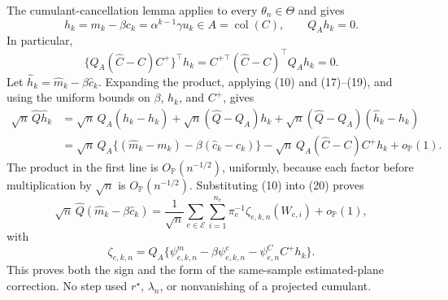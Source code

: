 The cumulant-cancellation lemma applies to every \(\theta_n\in\Theta\) and gives
\[
 h_k=m_k-\beta c_k=\alpha^{k-1}\gamma u_k\in A=\operatorname{col}(C),
 \qquad Q_Ah_k=0. \tag{18}
\]
In particular,
\[
 \{Q_A(\widehat C-C)C^+\}^\top h_k
 =C^{+\top}(\widehat C-C)^\top Q_Ah_k=0. \tag{19}
\]
Let \(\widehat h_k=\widehat m_k-\beta\widehat c_k\).  Expanding the product, applying (10) and (17)--(19), and using the uniform bounds on \(\beta\), \(h_k\), and \(C^+\), gives
\[
 \begin{aligned}
 \sqrt n\,\widehat Q\widehat h_k
 &=\sqrt n\,Q_A(\widehat h_k-h_k)
   +\sqrt n(\widehat Q-Q_A)h_k
   +\sqrt n(\widehat Q-Q_A)(\widehat h_k-h_k)\\
 &=\sqrt n\,Q_A\{(\widehat m_k-m_k)
       -\beta(\widehat c_k-c_k)\}
   -\sqrt n\,Q_A(\widehat C-C)C^+h_k+o_{\mathbb P}(1). 
 \end{aligned} \tag{20}
\]
The product in the first line is \(O_{\mathbb P}(n^{-1/2})\), uniformly, because each factor before multiplication by \(\sqrt n\) is \(O_{\mathbb P}(n^{-1/2})\).  Substituting (10) into (20) proves
\[
 \sqrt n\,\widehat Q(\widehat m_k-\beta\widehat c_k)
 =\frac1{\sqrt n}\sum_{e\in\mathcal E}\sum_{i=1}^{n_e}
   \pi_e^{-1}\zeta_{e,k,n}(W_{e,i})+o_{\mathbb P}(1), \tag{21}
\]
with
\[
 \zeta_{e,k,n}
 =Q_A\{\psi^m_{e,k,n}-\beta\psi^c_{e,k,n}
          -\psi^C_{e,n}C^+h_k\}. \tag{22}
\]
This proves both the sign and the form of the same-sample estimated-plane correction.  No step used \(r^\star\), \(\lambda_n\), or nonvanishing of a projected cumulant.


